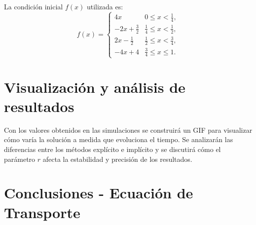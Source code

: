 \documentclass[12pt,a4paper]{article}
\begin{document}
La condición inicial $f(x)$ utilizada es:
\[
f(x) =
\begin{cases}
4x & 0 \leq x < \tfrac{1}{4}, \\
-2x + \tfrac{3}{2} & \tfrac{1}{4} \leq x < \tfrac{1}{2}, \\
2x - \tfrac{1}{2} & \tfrac{1}{2} \leq x < \tfrac{3}{4}, \\
-4x + 4 & \tfrac{3}{4} \leq x \leq 1.
\end{cases}
\]

\section{Visualización y análisis de resultados}

Con los valores obtenidos en las simulaciones se construirá un GIF para visualizar
cómo varía la solución a medida que evoluciona el tiempo. Se analizarán las diferencias entre los métodos explícito e implícito y se discutirá cómo el parámetro $r$ afecta la estabilidad y precisión de los resultados.

\section{Conclusiones - Ecuación de Transporte}
\end{document}
